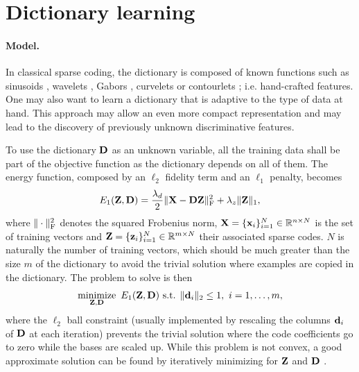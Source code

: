 \section{Dictionary learning} \label{sec:dictionary_learning}

\paragraph{Model.}
In classical sparse coding, the dictionary is composed of known functions such as sinusoids \cite{bracewell1965fourier}, wavelets \cite{mallat1999wavelet}, Gabors \cite{gabor1946gabor}, curvelets \cite{candes2002curvelet} or contourlets \cite{vetterli2003contourlet}; i.e. hand-crafted features. One may also want to learn a dictionary that is adaptive to the type of data at hand. This approach may allow an even more compact representation and may lead to the discovery of previously unknown discriminative features.

To use the dictionary $\mathbf{D}$ as an unknown variable, all the training data shall be part of the objective function as the dictionary depends on all of them. The energy function, composed by an $\ell_2$ fidelity term and an $\ell_1$ penalty, becomes
\begin{equation} \label{eqn:en_dict}
	E_1(\mathbf{Z}, \mathbf{D}) = \frac{\lambda_d}{2} \| \mathbf{X} - \mathbf{D} \mathbf{Z} \|_\text{F}^2 + \lambda_z \| \mathbf{Z} \|_1,
\end{equation}
where $\| \cdot \|_\text{F}^2$ denotes the squared Frobenius norm, $\mathbf{X} = \{\mathbf{x}_i\}_{i=1}^N \in \mathbb{R}^{n \times N}$ is the set of training vectors and $\mathbf{Z} = \{\mathbf{z}_i\}_{i=1}^N \in \mathbb{R}^{m \times N}$ their associated sparse codes. $N$ is naturally the number of training vectors, which should be much greater than the size $m$ of the dictionary to avoid the trivial solution where examples are copied in the dictionary. The problem to solve is then
\begin{equation} \label{eqn:pr_dict}
	\operatorname*{minimize}\limits_{\mathbf{Z},\mathbf{D}} \  E_1(\mathbf{Z}, \mathbf{D}) \text{ s.t. } \|\mathbf{d}_i\|_2 \leq 1, \ i = 1, \ldots, m,
\end{equation}
where the $\ell_2$ ball constraint (usually implemented by rescaling the columns $\mathbf{d}_i$ of $\mathbf{D}$ at each iteration) prevents the trivial solution where the code coefficients go to zero while the bases are scaled up. While this problem is not convex, a good approximate solution can be found by iteratively minimizing for $\mathbf{Z}$ and $\mathbf{D}$ \cite{olshausen1996SparseV1}.

